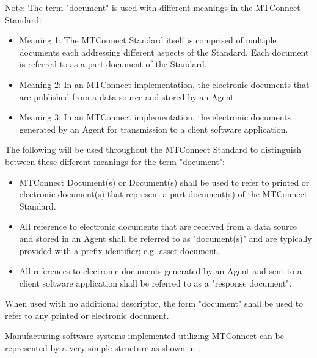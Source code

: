 \begin{note}
Note: The term "document" is used with different meanings in the MTConnect Standard:
\begin{itemize}

\item Meaning 1:  The MTConnect Standard itself is comprised of multiple documents each addressing different aspects of the Standard.  Each document is referred to as a \gls{part document} of the Standard.

\item Meaning 2:  In an MTConnect implementation, the electronic documents that are published from a data source and stored by an \gls{Agent}.     

\item Meaning 3:  In an MTConnect implementation, the electronic documents generated by an \gls{Agent} for transmission to a client software application. 
\end{itemize}

The following will be used throughout the MTConnect Standard to distinguish between these different meanings for the term "document":

\begin{itemize}

\item MTConnect Document(s) or Document(s) shall be used to refer to printed or electronic document(s) that represent a \gls{part document}(s) of the MTConnect Standard.  

\item All reference to electronic documents that are received from a data source and stored in an \gls{Agent} shall be referred to as "\gls{document}(s)" and are typically provided with a prefix identifier; e.g. \gls{asset document}.

\item All references to electronic documents generated by an \gls{Agent} and sent to a client software application shall be referred to as a "\gls{response document}".  
\end{itemize}

When used with no additional descriptor, the form "document" shall be used to refer to any printed or electronic document.
\end{note}

Manufacturing software systems implemented utilizing MTConnect can be represented by a very simple structure as shown in .

